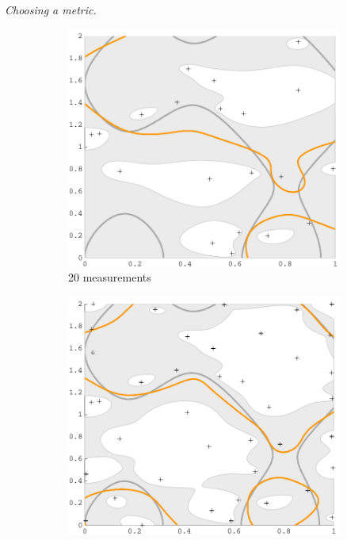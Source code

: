 \documentclass[11pt]{article} %
\begin{document}
\noindent\emph{Choosing a metric.}\;

\begin{figure}[tb]
  \begin{subfigure}[b]{0.5\textwidth}
    \centering
    \includegraphics[width=\textwidth]{figures/sin2d_20}
    \caption{20 measurements}
  \end{subfigure}
  \begin{subfigure}[b]{0.5\textwidth}
    \centering
    \includegraphics[width=\textwidth]{figures/sin2d_40}

\end{subfigure}
\end{figure}
\end{document}
